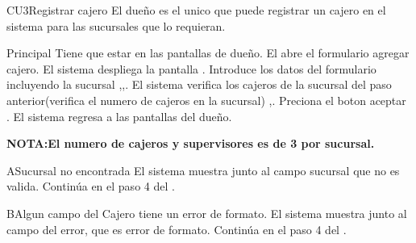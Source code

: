\begin{UseCase}{CU3}{Registrar cajero}{
		El dueño es el unico que puede registrar un cajero en el sistema para las sucursales que lo requieran.
	}
	\end{UseCase}
	\begin{UCtrayectoria}{Principal}
		\UCpaso [\UCactor] Tiene que estar en las pantallas de dueño.
		\UCpaso [\UCactor] El abre el formulario agregar cajero.
		\UCpaso El sistema despliega la pantalla .
		\UCpaso [\UCactor] Introduce los datos del formulario incluyendo la sucursal ,,.%
		\UCpaso El sistema verifica los cajeros de la sucursal del paso anterior(verifica el numero de cajeros en la sucursal) ,.%
		\UCpaso [\UCactor]Preciona el boton aceptar .
		\UCpaso El sistema regresa a las pantallas del dueño.
	\end{UCtrayectoria}

\textbf{NOTA:El numero de cajeros y supervisores es de 3 por sucursal.}


\begin{UCtrayectoriaA}{A}{Sucursal no encontrada}
			\UCpaso El sistema muestra junto al campo sucursal que no es valida.
			\UCpaso Continúa en el paso 4 del .
		\end{UCtrayectoriaA}


\begin{UCtrayectoriaA}{B}{Algun campo del Cajero tiene un error de formato.}
			\UCpaso El sistema muestra junto al campo del error, que es error de formato.
			\UCpaso Continúa en el paso 4 del .
		\end{UCtrayectoriaA}

